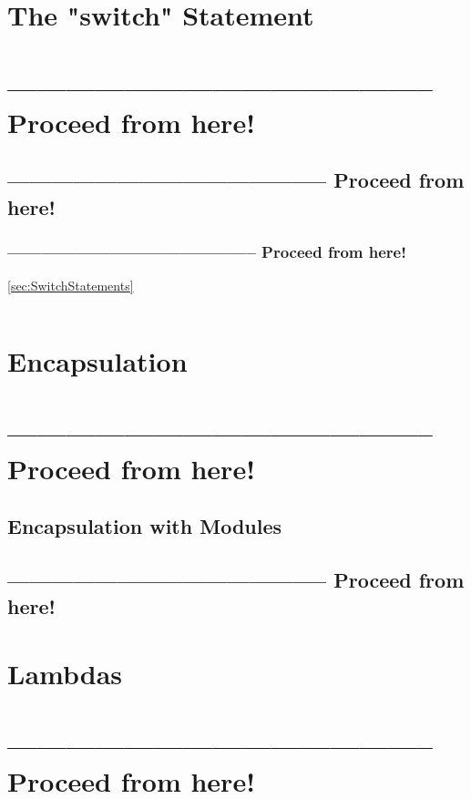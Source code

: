 \documentclass[11pt,a4paper, titlepage, parskip=half, headsepline, footsepline, cleardoublepage=current, headheight=1cm]{scrbook}
\begin{document}
\begin{lstlisting}
\end{lstlisting}

\section{The "switch" Statement}\label{sec:TheSwitchStatement}
\section{-------------------------------------------- Proceed from here!}
\subsection{-------------------------------------------- Proceed from here!}
\subsubsection{-------------------------------------------- Proceed from here!}
\lipsum[5]
\ref{sec:SwitchStatements}

\begin{lstlisting}
\end{lstlisting}

\section{Encapsulation}
\section{-------------------------------------------- Proceed from here!}
\lipsum[5]

\subsection{Encapsulation with Modules}\label{sec:EncapsulationWithModules}
\subsection{-------------------------------------------- Proceed from here!}
\lipsum[5]

\section{Lambdas}\label{sec:Lambdas}
\section{-------------------------------------------- Proceed from here!}
\lipsum[5]
\end{document}
